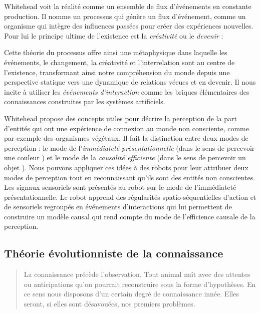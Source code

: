 Whitehead voit la réalité comme un ensemble de flux d'événements en constante production. 
Il nomme  un processus qui génère un flux d'événement, comme un organisme qui intègre des influences passées pour créer des expériences nouvelles. 
Pour lui le principe ultime de l'existence est la \emph{créativité} ou le \emph{devenir} :  

\begin{quote}
\end{quote}

Cette théorie du processus offre ainsi une métaphysique dans laquelle les événements, le changement, la créativité et l'interrelation sont au centre de l'existence, transformant ainsi notre compréhension du monde depuis une perspective statique vers une dynamique de relations vécues et en devenir.
Il nous incite à utiliser les \emph{événements d'interaction} comme les briques élémentaires des connaissances construites par les systèmes artificiels. 

Whitehead propose des concepts utiles pour décrire la perception de la part d'entités qui ont une expérience de connexion au monde non consciente, comme par exemple des organismes végétaux. 
Il fait la distinction entre deux modes de perception : le mode de l'\emph{immédiateté présentationnelle} (dans le sens de \og percevoir une couleur \fg) et le mode de la \emph{causalité efficiente} (dans le sens de \og percevoir un objet \fg). 
Nous pouvons appliquer ces idées à des robots pour leur attribuer deux modes de perception tout en reconnaissant qu'ils sont des entités non conscientes. 
Les signaux sensoriels sont présentés au robot sur le mode de l'immédiateté présentationnelle.
Le robot apprend des régularités spatio-séquentielles d'action et de  sensoriels regroupés en événements d'interactions qui lui permettent de construire un modèle causal qui rend compte du mode de l'efficience causale de la perception.



\subsection{Théorie évolutionniste de la connaissance}

\begin{quote}
	\og La connaissance précède l'observation. 
	Tout animal naît avec des attentes ou anticipations qu'on pourrait reconstruire sous la forme d'hypothèses. 
	En ce sens nous disposons d'un certain degré de connaissance innée. 
	Elles seront, si elles sont désavouées, nos premiers problèmes. \fg\ 
	\cite[p.~389]{popper_connaissance_1979}
\end{quote}

